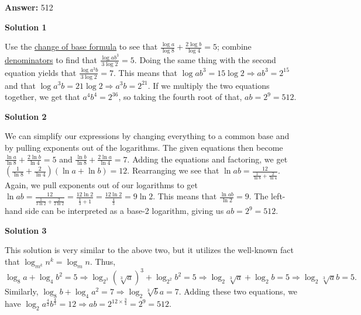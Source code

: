 \begin{enumerate}
 
 \textbf{Answer: }512



\textbf{Solution 1}

Use the \href{https://artofproblemsolving.com/wiki/index.php?title=Change\_of\_base\_formula}{change of base formula} to see that $\frac{\log a}{\log 8} + \frac{2 \log b}{\log 4} = 5$; combine \href{https://artofproblemsolving.com/wiki/index.php?title=Denominator}{denominators} to find that $\frac{\log ab^3}{3\log 2} = 5$. Doing the same thing with the second equation yields that $\frac{\log a^3b}{3\log 2} = 7$. This means that $\log ab^3 = 15\log 2 \Longrightarrow ab^3 = 2^{15}$ and that $\log a^3 b = 21\log 2 \Longrightarrow a^3 b = 2^{21}$. If we multiply the two equations together, we get that $a^4b^4 = 2^{36}$, so taking the fourth root of that, $ab = 2^9 = \boxed{512}$.

 



\textbf{Solution 2}

We can simplify our expressions by changing everything to a common base and by pulling exponents out of the logarithms. The given equations then become $\frac{\ln a}{\ln 8} + \frac{2 \ln b}{\ln 4} = 5$ and $\frac{\ln b}{\ln 8} + \frac{2 \ln a}{\ln 4} = 7$. Adding the equations and factoring, we get $(\frac{1}{\ln 8}+\frac{2}{\ln 4})(\ln a+ \ln b)=12$. Rearranging we see that $\ln ab = \frac{12}{\frac{1}{\ln 8}+\frac{2}{\ln 4}}$. Again, we pull exponents out of our logarithms to get $\ln ab = \frac{12}{\frac{1}{3 \ln 2} + \frac{2}{2 \ln 2}} = \frac{12 \ln 2}{\frac{1}{3} + 1} = \frac{12 \ln 2}{\frac{4}{3}} = 9 \ln 2$. This means that $\frac{\ln ab}{\ln 2} = 9$. The left-hand side can be interpreted as a base-2 logarithm, giving us $ab = 2^9 = \boxed{512}$.

 



\textbf{Solution 3}

This solution is very similar to the above two, but it utilizes the well-known fact that $\log_{m^k}{n^k}= \log_m{n}.$ Thus, $\log_8a+\log_4b^2=5 \Rightarrow  \log_{2^3}{(\sqrt[3]{a})^3} + \log_{2^2}{b^2} = 5 \Rightarrow \log_2{\sqrt[3]{a}} + \log_2{b} = 5 \Rightarrow \log_2{\sqrt[3]{a}b} = 5.$ Similarly, $\log_8b+\log_4a^2=7 \Rightarrow \log_2{\sqrt[3]{b}a} = 7.$ Adding these two equations, we have $\log_2{a^{\frac{4}{3}}b^{\frac{4}{3}}} = 12 \Rightarrow ab = 2^{12\times\frac{3}{4}} = 2^9 = \boxed{512}$.

 




\end{enumerate}
